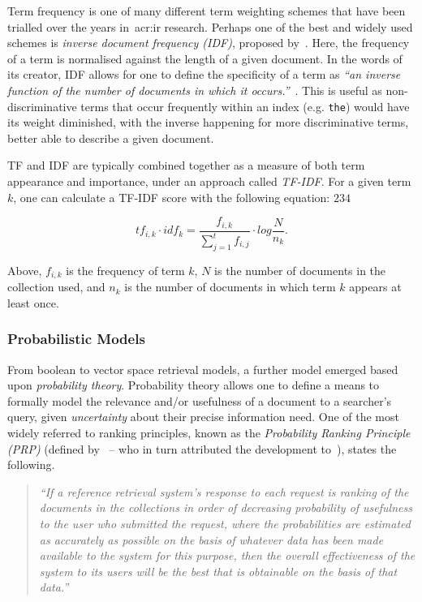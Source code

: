 Term frequency is one of many different term weighting schemes that have been trialled over the years in~\gls{acr:ir} research. Perhaps one of the best and widely used schemes is \emph{inverse document frequency (IDF)}, proposed by~\cite{sparck1972statistical}. Here, the frequency of a term is normalised against the length of a given document. In the words of its creator, IDF allows for one to define the specificity of a term as \emph{``an inverse function of the number of documents in which it occurs.''}~\citep{sparck1972statistical}. This is useful as non-discriminative terms that occur frequently within an index (e.g. \texttt{the}) would have its weight diminished, with the inverse happening for more discriminative terms, better able to describe a given document.

TF and IDF are typically combined together as a measure of both term appearance and importance, under an approach called \emph{TF-IDF}. For a given term $k$, one can calculate a TF-IDF score with the following equation: $ 2 3 4 $

\begin{equation*}
tf_{i,k} \cdot idf_{k} = \frac{f_{i,k}}{\sum_{j=1}^{t} f_{i,j}} \cdot log \frac{N}{n_k}.
\end{equation*}

Above, $f_{i,k}$ is the frequency of term $k$, $N$ is the number of documents in the collection used, and $n_k$ is the number of documents in which term $k$ appears at least once.

\subsubsection{Probabilistic Models}
From boolean to vector space retrieval models, a further model emerged based upon \emph{probability theory}. Probability theory allows one to define a means to formally model the relevance and/or usefulness of a document to a searcher's query, given \emph{uncertainty} about their precise information need. One of the most widely referred to ranking principles, known as the \emph{Probability Ranking Principle (PRP)} (defined by~\cite{robertson1977prp} -- who in turn attributed the development to~\cite{cooper1971relevance}), states the following.

\begin{quote}
\emph{``If a reference retrieval system's response to each request is ranking of the documents in the collections in order of decreasing probability of usefulness to the user who submitted the request, where the probabilities are estimated as accurately as possible on the basis of whatever data has been made available to the system for this purpose, then the overall effectiveness of the system to its users will be the best that is obtainable on the basis of that data.''}
\end{quote}

